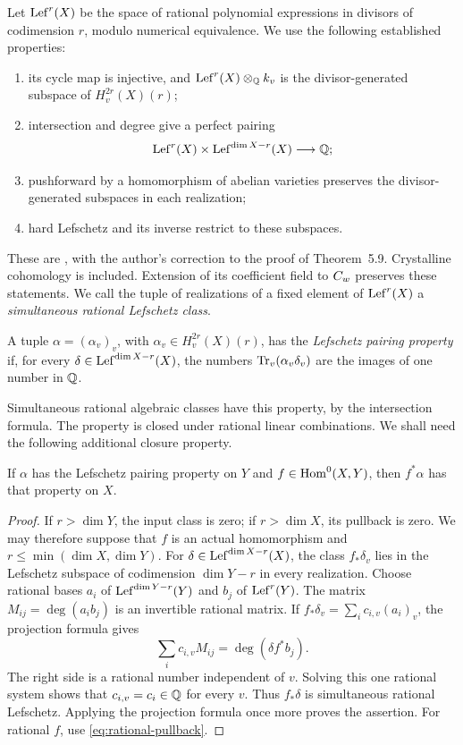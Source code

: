 Let \(\operatorname{Lef}^r(X)\) be the space of rational polynomial expressions in
divisors of codimension \(r\), modulo numerical equivalence. We use the
following established properties:
\begin{enumerate}[label=(\roman*)]
 \item its cycle map is injective, and
 \(\operatorname{Lef}^r(X)\otimes_\mathbb Q k_v\) is the divisor-generated subspace of
 \(H_v^{2r}(X)(r)\);
 \item intersection and degree give a perfect pairing
 \[
   \operatorname{Lef}^r(X)\times\operatorname{Lef}^{\dim X-r}(X)\longrightarrow\mathbb Q;
 \]
 \item pushforward by a homomorphism of abelian varieties preserves the
 divisor-generated subspaces in each realization;
 \item hard Lefschetz and its inverse restrict to these subspaces.
\end{enumerate}
These are \cite[Proposition~5.2, Corollaries~5.3 and~5.5,
Theorem~5.9]{Milne1999}, with the author's correction to the proof of
Theorem~5.9. Crystalline cohomology is included. Extension of its
coefficient field to \(C_w\) preserves these statements. We call the
tuple of realizations of a fixed element of \(\operatorname{Lef}^r(X)\) a
\emph{simultaneous rational Lefschetz class}.

\begin{definition}
A tuple \(\alpha=(\alpha_v)_v\), with
\(\alpha_v\in H_v^{2r}(X)(r)\), has the \emph{Lefschetz pairing
property} if, for every \(\delta\in\operatorname{Lef}^{\dim X-r}(X)\), the numbers
\(\operatorname{Tr}_v(\alpha_v\delta_v)\) are the images of one number in \(\mathbb Q\).
\end{definition}

Simultaneous rational algebraic classes have this property, by the
intersection formula. The property is closed under rational linear
combinations. We shall need the following additional closure property.

\begin{lemma}\label{lem:pairing-functorial}
If \(\alpha\) has the Lefschetz pairing property on \(Y\) and
\(f\in\operatorname{Hom}^0(X,Y)\), then \(f^*\alpha\) has that property on \(X\).
\end{lemma}

\begin{proof}
If \(r>\dim Y\), the input class is zero; if \(r>\dim X\),
its pullback is zero. We may therefore suppose that \(f\) is an actual
homomorphism and \(r\leq\min(\dim X,\dim Y)\).
For \(\delta\in\operatorname{Lef}^{\dim X-r}(X)\), the class \(f_*\delta_v\)
lies in the Lefschetz subspace of codimension \(\dim Y-r\) in every
realization. Choose rational bases \(a_i\) of
\(\operatorname{Lef}^{\dim Y-r}(Y)\) and \(b_j\) of \(\operatorname{Lef}^r(Y)\). The matrix
\(M_{ij}=\deg(a_i b_j)\) is an invertible rational matrix. If
\(f_*\delta_v=\sum_i c_{i,v}(a_i)_v\), the projection formula gives
\[
 \sum_i c_{i,v}M_{ij}=\deg(\delta f^*b_j).
\]
The right side is a rational number independent of \(v\). Solving this
one rational system shows that \(c_{i,v}=c_i\in\mathbb Q\) for every \(v\).
Thus \(f_*\delta\) is simultaneous rational Lefschetz. Applying the
projection formula once more proves the assertion. For rational \(f\),
use \eqref{eq:rational-pullback}.
\end{proof}

